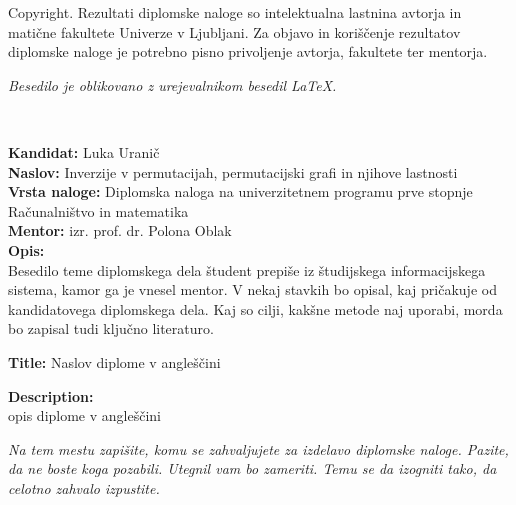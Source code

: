 \documentclass[a4paper, 12pt]{book}
\newcommand{\clearemptydoublepage}{\newpage{\pagestyle{empty}\cleardoublepage}}
\begin{document}
\thispagestyle{empty}
\vspace*{8cm}

\noindent
{\sc Copyright}. 
Rezultati diplomske naloge so intelektualna lastnina avtorja in matične fakultete Univerze v Ljubljani.
Za objavo in koriščenje rezultatov diplomske naloge je potrebno pisno privoljenje avtorja, fakultete ter mentorja.

\begin{center}
\mbox{}\vfill
\emph{Besedilo je oblikovano z urejevalnikom besedil \LaTeX.}
\end{center}
\clearemptydoublepage

\thispagestyle{empty}
\
\vfill

\bigskip
\noindent\textbf{Kandidat:} Luka Uranič\\
\noindent\textbf{Naslov:} Inverzije v permutacijah, permutacijski grafi in njihove lastnosti\\
\noindent\textbf{Vrsta naloge:} Diplomska naloga na univerzitetnem programu prve stopnje Računalništvo in matematika \\
\noindent\textbf{Mentor:}  izr. prof. dr. Polona Oblak\\

\bigskip
\noindent\textbf{Opis:}\\
Besedilo teme diplomskega dela študent prepiše iz študijskega informacijskega sistema, kamor ga je vnesel mentor. 
V nekaj stavkih bo opisal, kaj pričakuje od kandidatovega diplomskega dela. 
Kaj so cilji, kakšne metode naj uporabi, morda bo zapisal tudi ključno literaturo.

\bigskip
\noindent\textbf{Title:} Naslov diplome v angleščini

\bigskip
\noindent\textbf{Description:}\\
opis diplome v angleščini

\vfill



\vspace{2cm}

\clearemptydoublepage

\thispagestyle{empty}\mbox{}\vfill\null\it%
\noindent
Na tem mestu zapišite, komu se zahvaljujete za izdelavo diplomske naloge. Pazite, da ne boste koga pozabili. Utegnil vam bo zameriti. Temu se da izogniti tako, da celotno zahvalo izpustite.
\rm\normalfont
\end{document}
